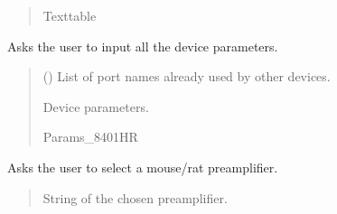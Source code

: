 \documentclass[letterpaper,10pt,english]{sphinxmanual}
\begin{document}
\begin{fulllineitems}
\begin{fulllineitems}
\begin{quote}
\begin{description}
\sphinxAtStartPar
Texttable

\end{description}\end{quote}

\end{fulllineitems}


\begin{fulllineitems}
\label{\detokenize{Setup.SetupOneDevice:Setup.SetupOneDevice.Setup_8401HR.Setup8401HR._GetParam_onePODdevice}}
\pysigstartsignatures
{}
\pysigstopsignatures
\sphinxAtStartPar
Asks the user to input all the device parameters.
\begin{quote}\begin{description}
\sphinxAtStartPar
{} (\sphinxstyleliteralemphasis{\sphinxupquote{{[}}}\sphinxstyleliteralemphasis{\sphinxupquote{{]}}}) \textendash{} List of port names already used by other devices.

\sphinxAtStartPar
Device parameters.

\sphinxAtStartPar
Params\_8401HR

\end{description}\end{quote}

\end{fulllineitems}


\begin{fulllineitems}
\label{\detokenize{Setup.SetupOneDevice:Setup.SetupOneDevice.Setup_8401HR.Setup8401HR._GetPreampDeviceName}}
\pysigstartsignatures
{}
\pysigstopsignatures
\sphinxAtStartPar
Asks the user to select a mouse/rat preamplifier.
\begin{quote}\begin{description}
\sphinxAtStartPar
String of the chosen preamplifier.


\end{description}
\end{quote}
\end{fulllineitems}
\end{fulllineitems}
\end{document}
